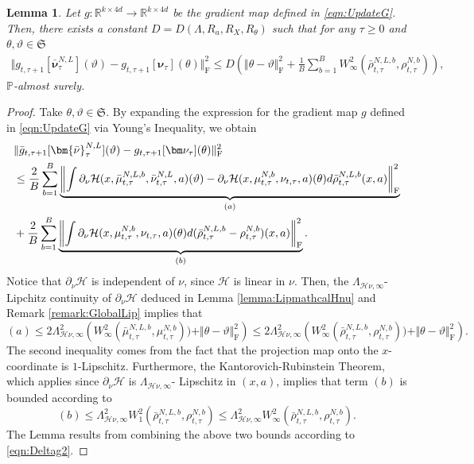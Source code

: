 \documentclass{article}
\newtheorem{lemma}[theorem]{Lemma}
\newcommand{\R}{\mathbb{R}}
\begin{document}
\begin{appendices}
\begin{lemma}\label{lemma:GradCont}
Let $g:\R^{k\times 4d}\to \R^{k\times 4d}$ be the gradient map defined in \eqref{eqn:UpdateG}. Then, there exists a constant $ D= D(\Lambda,R_a,R_X, R_\theta)$ such that for any $\tau \ge 0$ and $\theta ,\vartheta \in \mathfrak S$
\begin{align*}
    \Vert g_{t,\tau+1}[\bm{\bar\nu}^{N,L}_\tau](\vartheta)-g_{t,\tau+1}[\bm\nu_\tau](\theta)\Vert^2_\mathrm{F} \le  D\left(\Vert \theta- \vartheta\Vert^2_\mathrm{F} +\frac{1}{B}\sum_{b=1}^B W^2_{\infty}(\bar\rho^{N,L,b}_{t,\tau},\rho^{N,b}_{t,\tau})\right),
\end{align*}
$\mathbb P$-almost surely.
\end{lemma}
\begin{proof}
Take $\theta, \vartheta\in \mathfrak S$. By expanding the expression for the gradient map $g$ defined in \eqref{eqn:UpdateG} via Young's Inequality, we obtain
\begin{align}\label{eqn:Deltag2}
    &\Vert \bar g_{t,\tau+1}[\bm{\bar\nu}^{N,L}_\tau](\vartheta)-g_{t,\tau+1}[\bm\nu_\tau](\theta)\Vert^2_\mathrm{F} \\ &\le \frac{2}{B}\sum_{b=1}^B \underbrace{ \left\Vert\int \partial_\nu\mathcal H(x,\bar \mu^{N,L,b}_{t,\tau}, \bar\nu^{N,L}_{t,\tau},a)(\vartheta) - \partial_\nu\mathcal H(x,\mu^{N,b}_{t,\tau}, \nu_{t,\tau},a)(\theta) d \bar\rho^{N,L,b}_{t,\tau}(x,a) \right\Vert^2_\mathrm{F}}_{(a)}\notag\\
    &+\frac{2}{B}\sum_{b=1}^B \underbrace{\left\Vert\int \partial_\nu\mathcal H(x,\mu^{N,b}_{t,\tau}, \nu_{t,\tau},a)(\theta) d (\bar\rho^{N,L,b}_{t,\tau}-\rho^{N,b}_{t,\tau})(x,a) \right\Vert^2_\mathrm{F}}_{(b)}.\notag
\end{align} 
Notice that $\partial_\nu\mathcal H$ is independent of $\nu$, since $\mathcal H$ is linear in $\nu$.
Then, the $\Lambda_{\mathcal H\nu,\infty}$-Lipchitz continuity of $\partial_\nu\mathcal H$ deduced in Lemma \ref{lemma:LipmathcalHnu} and Remark \ref{remark:GlobalLip} implies that 
\[
(a) \le 2\Lambda_{\mathcal H\nu,\infty}^2 \left( W_\infty^2(\bar \mu^{N,L,b}_{t,\tau}, \mu^{N,b}_{t,\tau})) + \Vert \theta- \vartheta\Vert^2_\mathrm{F}\right)\le 2\Lambda_{\mathcal H\nu,\infty}^2 \left( W_\infty^2(\bar \rho^{N,L,b}_{t,\tau}, \rho^{N,b}_{t,\tau})) + \Vert \theta- \vartheta\Vert^2_\mathrm{F}\right).
\]
The second inequality comes from the fact that the projection map onto the $x$-coordinate is $1$-Lipschitz.
Furthermore,
 the Kantorovich-Rubinstein Theorem, which applies since $\partial_\nu\mathcal H$ is $\Lambda_{\mathcal H\nu,\infty}$- Lipschitz in $(x,a)$, implies that term $(b)$ is bounded according to
\[
(b) \le\Lambda_{\mathcal H\nu,\infty}^2 W_1^2(\bar\rho^{N,L,b}_{t,\tau},\rho^{N,b}_{t,\tau}) \le \Lambda_{\mathcal H\nu,\infty}^2  W_\infty^2(\bar\rho^{N,L,b}_{t,\tau},\rho^{N,b}_{t,\tau}).
\]
The Lemma results from combining the above two bounds according to \eqref{eqn:Deltag2}.
\end{proof}

\end{appendices}
\end{document}
